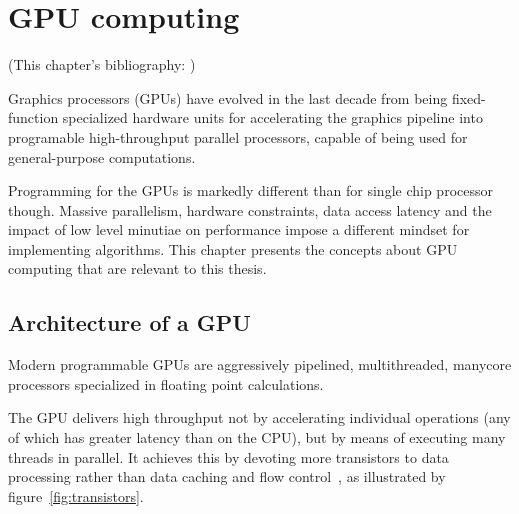 \chapter{GPU computing}
\label{ch:gpu-computing}

(This chapter's bibliography:
\cite{cudaprog2} \cite{owens08} \cite{jansen07} \cite{lejdfors08}%
)

Graphics processors (GPUs) have evolved in the last decade
from being fixed-function specialized hardware units
for accelerating the graphics pipeline
into programable high-throughput parallel processors,
capable of being used for general-purpose computations.

Programming for the GPUs is markedly different
than for single chip processor though.
Massive parallelism,
hardware constraints,
data access latency and
the impact of low level minutiae on performance
impose a different mindset for implementing algorithms.
This chapter presents the concepts
about GPU computing that are relevant to this thesis.

\section{Architecture of a GPU}

Modern programmable GPUs are aggressively pipelined,
multithreaded, manycore processors
specialized in floating point calculations.

The GPU delivers high throughput not by accelerating individual operations
(any of which has greater latency than on the CPU),
but by means of executing many threads in parallel.
It achieves this by devoting more transistors to data processing
rather than data caching and flow control~\cite[\S1]{cudaprog2},
as illustrated by figure~\ref{fig:transistors}.

